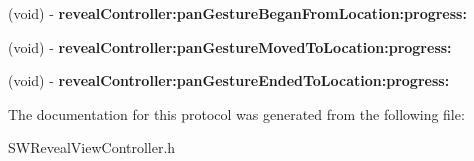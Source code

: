 \begin{DoxyCompactItemize}
\item 
\mbox{\label{protocol_s_w_reveal_view_controller_delegate-p_a9d39b0c15b6f3ecd3c34a1ea8150a17c}} 
(void) -\/ {\bfseries reveal\+Controller\+:pan\+Gesture\+Began\+From\+Location\+:progress\+:}
\item 
\mbox{\label{protocol_s_w_reveal_view_controller_delegate-p_a53943ec289e683e8d735fcd5894d94c0}} 
(void) -\/ {\bfseries reveal\+Controller\+:pan\+Gesture\+Moved\+To\+Location\+:progress\+:}
\item 
\mbox{\label{protocol_s_w_reveal_view_controller_delegate-p_acb909fe35bff4184279eddb74c80771e}} 
(void) -\/ {\bfseries reveal\+Controller\+:pan\+Gesture\+Ended\+To\+Location\+:progress\+:}
\end{DoxyCompactItemize}


The documentation for this protocol was generated from the following file\+:\begin{DoxyCompactItemize}
\item 
S\+W\+Reveal\+View\+Controller.\+h\end{DoxyCompactItemize}
